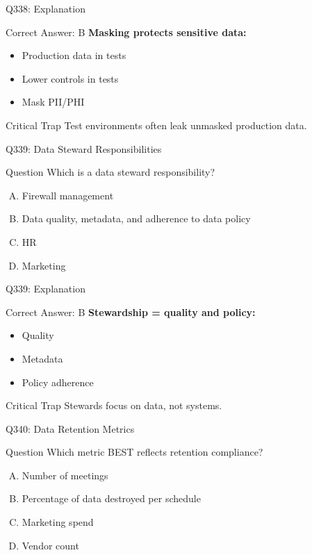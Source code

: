 \documentclass{beamer}
\begin{document}
	\begin{frame}{Q338: Explanation}
		\begin{block}{Correct Answer: B}
			\textbf{Masking protects sensitive data:}
			\begin{itemize}
				\item Production data in tests
				\item Lower controls in tests
				\item Mask PII/PHI
			\end{itemize}
		\end{block}
		\begin{alertblock}{Critical Trap}
			Test environments often leak unmasked production data.
		\end{alertblock}
	\end{frame}
	
	\begin{frame}{Q339: Data Steward Responsibilities}
		\begin{block}{Question}
			Which is a data steward responsibility?
		\end{block}
		\begin{enumerate}[(A)]
			\item Firewall management
			\item Data quality, metadata, and adherence to data policy
			\item HR
			\item Marketing
		\end{enumerate}
	\end{frame}
	
	\begin{frame}{Q339: Explanation}
		\begin{block}{Correct Answer: B}
			\textbf{Stewardship = quality and policy:}
			\begin{itemize}
				\item Quality
				\item Metadata
				\item Policy adherence
			\end{itemize}
		\end{block}
		\begin{alertblock}{Critical Trap}
			Stewards focus on data, not systems.
		\end{alertblock}
	\end{frame}
	
	\begin{frame}{Q340: Data Retention Metrics}
		\begin{block}{Question}
			Which metric BEST reflects retention compliance?
		\end{block}
		\begin{enumerate}[(A)]
			\item Number of meetings
			\item Percentage of data destroyed per schedule
			\item Marketing spend
			\item Vendor count
		\end{enumerate}
	\end{frame}
	
\end{document}
